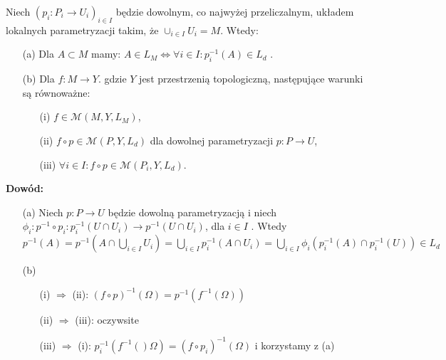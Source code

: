 \begin{tw}
	Niech $(p_i: P_i \rightarrow U_i)_{i \in I}$ będzie dowolnym, co najwyżej przeliczalnym, układem lokalnych parametryzacji takim, że $\cup_{i \in I} U_i = M$. Wtedy:
	\begin{enumerate}
		\item[(a)] Dla $A \subset M$ mamy: $A \in L_M \Leftrightarrow \forall i \in I: p_i^{-1}(A) \in L_d$ .
		\item[(b)] Dla $f: M \rightarrow Y$. gdzie $Y$ jest przestrzenią topologiczną, następujące warunki są równoważne:
			\begin{enumerate}
				\item[(i)] $f \in \mathcal{M}(M, Y, L_M)$,
				\item[(ii)] $f \circ p \in \mathcal{M}(P, Y, L_d)$ dla dowolnej parametryzacji $p: P \rightarrow U$,
				\item[(iii)] $\forall i \in I: f \circ p \in \mathcal{M}(P_i, Y, L_d)$.
			\end{enumerate}
	\end{enumerate}
	\textbf{Dowód:}
	\begin{enumerate}
		\item[(a)] Niech $p: P \rightarrow U$ będzie dowolną parametryzacją i niech $\phi_i: p^{-1} \circ p_i: p^{-1}_i(U \cap U_i) \rightarrow p^{-1}(U \cap U_i)$, dla $i \in I$  . Wtedy $p^{-1}(A) = p^{-1}(A \cap \bigcup_{i\in I} U_i) = \bigcup_{i \in I} p^{-1}_i(A \cap U_i) = \bigcup_{i \in I} \phi_i(p_i^{-1}(A) \cap p_i^{-1}(U)) \in L_d$ 
		\item[(b)]
			\begin{enumerate} 
				\item[(i)] $\Longrightarrow$ (ii): $(f \circ p)^{-1}(\Omega) = p^{-1}(f^{-1}(\Omega))$ 
				\item[(ii)] $\Longrightarrow$ (iii): oczywsite
				\item[(iii)] $\Longrightarrow$ (i): $p_i^{-1}(f^{-1}()\Omega) = (f \circ p_i)^{-1}(\Omega)$ i korzystamy z (a)
			\end{enumerate}
	\end{enumerate}
\end{tw}